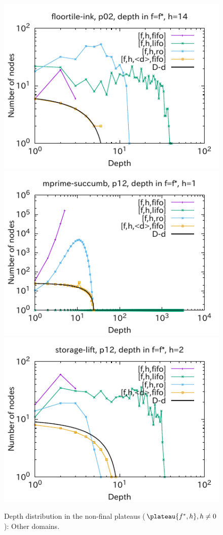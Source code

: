 \begin{figure}[htbp]
\includegraphics{img/output-lmcut/floortile-ink/p02-14.pdf}
\includegraphics{img/output-lmcut/mprime-succumb/p12-1.pdf}
\includegraphics{img/output-lmcut/storage-lift/p12-2.pdf}
 \caption{Depth distribution in the non-final plateaus ($\plateau{f^*,h}, h\not=0$): Other domains.}
 \label{fig:depth-histogram5}
\end{figure}

